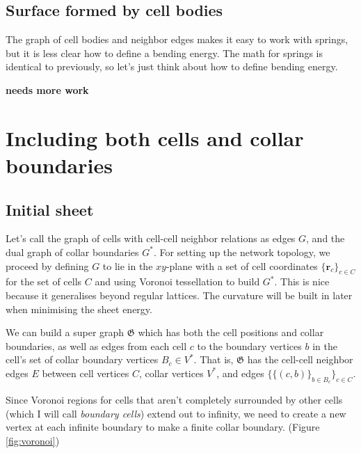 \subsection{Surface formed by cell bodies}

The graph of cell bodies and neighbor edges makes it easy to work with springs, but it is less clear how to define a bending energy. The math for springs is identical to previously, so let's just think about how to define bending energy.

\textbf{needs more work}


\section{Including both cells and collar boundaries}

\subsection{Initial sheet}
Let's call the graph of cells with cell-cell neighbor relations as edges $G$, and the dual graph of collar boundaries $G^*$. For setting up the network topology, we proceed by defining $G$ to lie in the $xy$-plane with a set of cell coordinates $\{\bm{r}_c\}_{c\in C}$ for the set of cells $C$ and using Voronoi tessellation to build $G^*$. This is nice because it generalises beyond regular lattices. The curvature will be built in later when minimising the sheet energy.

We can build a super graph $\mathfrak{G}$ which has both the cell positions and collar boundaries, as well as edges from each cell $c$ to the boundary vertices $b$ in the cell's set of collar boundary vertices $B_c \in V^*$. That is, $\mathfrak{G}$ has the cell-cell neighbor edges $E$ between cell vertices $C$, collar vertices $V^*$, and edges $\{ \{(c, b)\}_{b\in B_c} \}_{c\in C}$. 

Since Voronoi regions for cells that aren't completely surrounded by other cells (which I will call \textit{boundary cells}) extend out to infinity, we need to create a new vertex at each infinite boundary to make a finite collar boundary. (Figure \ref{fig:voronoi})


